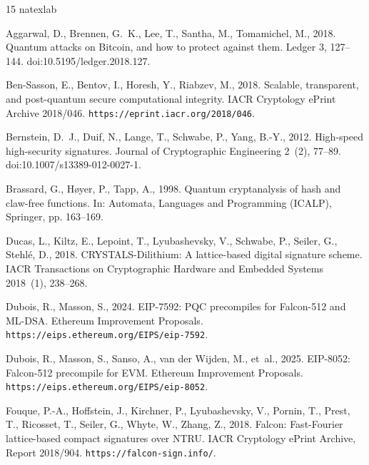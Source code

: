 \documentclass[a4paper,fleqn]{cas-dc}
\begin{document}
\begin{thebibliography}{15}
\fontsize{6.2pt}{7.0pt}\selectfont
\setlength{\itemsep}{-0.5pt}
\setlength{\parskip}{0pt}
\expandafter\ifx\csname natexlab\endcsname\relax\def\natexlab#1{#1}\fi
\providecommand{\url}[1]{\texttt{#1}}
\providecommand{\href}[2]{#2}

Aggarwal, D., Brennen, G.~K., Lee, T., Santha, M., Tomamichel, M., 2018.
Quantum attacks on Bitcoin, and how to protect against them.
Ledger 3, 127--144. \href{https://doi.org/10.5195/ledger.2018.127}{doi:10.5195/ledger.2018.127}.

Ben-Sasson, E., Bentov, I., Horesh, Y., Riabzev, M., 2018.
Scalable, transparent, and post-quantum secure computational integrity.
IACR Cryptology ePrint Archive 2018/046. \url{https://eprint.iacr.org/2018/046}.

Bernstein, D.~J., Duif, N., Lange, T., Schwabe, P., Yang, B.-Y., 2012.
High-speed high-security signatures.
Journal of Cryptographic Engineering 2~(2), 77--89. \href{https://doi.org/10.1007/s13389-012-0027-1}{doi:10.1007/s13389-012-0027-1}.

Brassard, G., H\o yer, P., Tapp, A., 1998.
Quantum cryptanalysis of hash and claw-free functions.
In: Automata, Languages and Programming (ICALP), Springer, pp. 163--169.

Ducas, L., Kiltz, E., Lepoint, T., Lyubashevsky, V., Schwabe, P., Seiler, G., Stehl{\'e}, D., 2018.
CRYSTALS-Dilithium: A lattice-based digital signature scheme.
IACR Transactions on Cryptographic Hardware and Embedded Systems 2018~(1), 238--268.

Dubois, R., Masson, S., 2024.
EIP-7592: PQC precompiles for Falcon-512 and ML-DSA.
Ethereum Improvement Proposals. \url{https://eips.ethereum.org/EIPS/eip-7592}.

Dubois, R., Masson, S., Sanso, A., van der Wijden, M., et~al., 2025.
EIP-8052: Falcon-512 precompile for EVM.
Ethereum Improvement Proposals. \url{https://eips.ethereum.org/EIPS/eip-8052}.

Fouque, P.-A., Hoffstein, J., Kirchner, P., Lyubashevsky, V., Pornin, T., Prest, T., Ricosset, T., Seiler, G., Whyte, W., Zhang, Z., 2018.
Falcon: Fast-Fourier lattice-based compact signatures over NTRU.
IACR Cryptology ePrint Archive, Report 2018/904. \url{https://falcon-sign.info/}.


\end{thebibliography}
\end{document}
